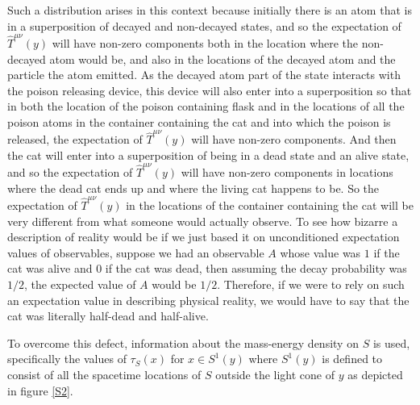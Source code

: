   Such a distribution arises in this context because initially there is an atom that is in a superposition of decayed and non-decayed states, and so the expectation of $\hat{T}^{\mu\nu}(y)$ will have non-zero components both in the location where the non-decayed atom would be, and also in the locations of the decayed atom and the particle the atom emitted. As the decayed atom part of the state interacts with the poison releasing device, this device will also enter into a superposition so that in both the location of the poison containing flask and in the locations of all the poison atoms in the container containing the cat and into which the poison is released, the expectation of $\hat{T}^{\mu\nu}(y)$ will have non-zero components. And then the cat will enter into a superposition of being in a dead state and an alive state, and so  the expectation of $\hat{T}^{\mu\nu}(y)$ will have non-zero components in locations where the dead cat ends up and where the living cat happens to be. So the expectation of $\hat{T}^{\mu\nu}(y)$ in the locations of the container containing the cat will be very different from what someone would actually observe. To see how bizarre a description of reality would be if we just based it on unconditioned expectation values of observables, suppose we had an observable $A$ whose value was $1$ if the cat was alive and $0$ if the cat was dead, then assuming the decay probability was $1/2$, the expected value of $A$ would be $1/2$. Therefore, if we were to rely on such an expectation value in describing physical reality, we would have to say that the cat was literally half-dead and half-alive. 

  To overcome this defect, information about the mass-energy density on $S$ is used, specifically the values of $\tau_S(x)$ for $x\in S^1(y)$ where  $S^1(y)$  %
  is defined to consist of all the spacetime locations of $S$ outside the light cone of $y$ as depicted in figure \ref{S2}.  

